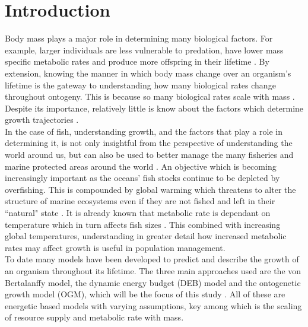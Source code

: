 \documentclass[a4paper, 11pt, hidelinks]{article} %
\begin{document}
	\tableofcontents
	\newpage

\section{Introduction}
	\linenumbers


	Body mass plays a major role in determining many biological factors.  For example, larger individuals are less vulnerable to predation, have lower mass specific metabolic rates and produce more offspring in their lifetime \parencite{Peters1983, Barneche2018, Craig2006, Magnhagen2001, Hixon2014, Marshall2006}.
	By extension, knowing the manner in which body mass change over an organism's lifetime is the gateway to understanding how many biological rates change throughout ontogeny.  This is because so many biological rates scale with mass \parencite{Kleiber1932}.  Despite its importance, relatively little is know about the factors which determine growth trajectories \parencite{Arendt2011, Marshall2019}.
	\\
	In the case of fish, understanding growth, and the factors that play a role in determining it, is not only insightful from the perspective of understanding the world around us, but can also be used to better manage the many fisheries and marine protected areas around the world \parencite{Heino2013, Lester2009}.  An objective which is becoming increasingly important as the oceans' fish stocks continue to be depleted by overfishing. 
	This is compounded by global warming which threatens to alter the structure of marine ecosystems even if they are not fished and left in their ``natural" state \parencite{Bruno2018}.
	It is already known that metabolic rate is dependant on temperature which in turn affects fish sizes \parencite{Gillooly2001, Brown2004}.  This combined with increasing global temperatures, understanding in greater detail how increased metabolic rates %
	may affect growth is useful in population management.
	\\
	To date many models have been developed to predict and describe the growth of an organism throughout its lifetime.  The three main approaches used are the von Bertalanffy model, the dynamic energy budget (DEB) model and the ontogenetic growth model (OGM), which will be the focus of this study \parencite{Putter1918, vonBertalanffy1938, Kooijman1986, West2001}.  All of these are energetic based models with varying assumptions, key among which is the scaling of resource supply and metabolic rate with mass. %
\end{document}
